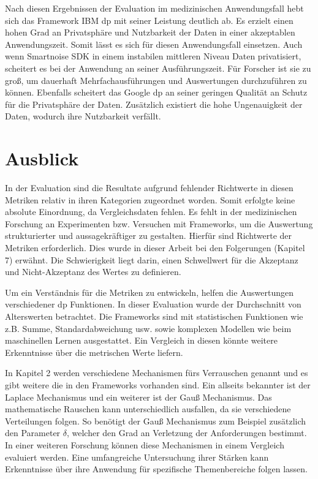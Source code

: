Nach diesen Ergebnissen der Evaluation im medizinischen Anwendungsfall hebt sich das Framework IBM \gls{dp} mit seiner Leistung deutlich ab. Es erzielt einen hohen Grad an Privatsphäre und Nutzbarkeit der Daten in einer akzeptablen Anwendungszeit. Somit lässt es sich für diesen Anwendungsfall einsetzen. Auch wenn Smartnoise SDK in einem instabilen mittleren Niveau Daten privatisiert, scheitert es bei der Anwendung an seiner Ausführungszeit. Für Forscher ist sie zu groß, um dauerhaft Mehrfachausführungen und Auswertungen durchzuführen zu können. Ebenfalls scheitert das Google \gls{dp} an seiner geringen Qualität an Schutz für die Privatsphäre der Daten. Zusätzlich existiert die hohe Ungenauigkeit der Daten, wodurch ihre Nutzbarkeit verfällt.
\section{Ausblick}
In der Evaluation sind die Resultate aufgrund fehlender Richtwerte in diesen Metriken relativ in ihren Kategorien zugeordnet worden. Somit erfolgte keine absolute Einordnung, da Vergleichsdaten fehlen. Es fehlt in der medizinischen Forschung an Experimenten bzw. Versuchen mit Frameworks, um die Auswertung strukturierter und aussagekräftiger zu gestalten. Hierfür sind Richtwerte der Metriken erforderlich. Dies wurde in dieser Arbeit bei den Folgerungen (Kapitel 7) erwähnt. Die Schwierigkeit liegt darin, einen Schwellwert für die Akzeptanz und Nicht-Akzeptanz des Wertes zu definieren. 

Um ein Verständnis für die Metriken zu entwickeln, helfen die Auswertungen verschiedener \gls{dp} Funktionen. In dieser Evaluation wurde der Durchschnitt von Alterswerten betrachtet. Die Frameworks sind mit statistischen Funktionen wie z.B. Summe, Standardabweichung usw. sowie komplexen Modellen wie beim maschinellen Lernen ausgestattet. Ein Vergleich in diesen könnte weitere Erkenntnisse über die metrischen Werte liefern.

In Kapitel 2 werden verschiedene Mechanismen fürs Verrauschen genannt und es gibt weitere die in den Frameworks vorhanden sind. Ein allseits bekannter ist der Laplace Mechanismus und ein weiterer ist der Gauß Mechanismus. Das mathematische Rauschen kann unterschiedlich ausfallen, da sie verschiedene Verteilungen folgen. So benötigt der Gauß Mechanismus zum Beispiel zusätzlich den Parameter $\delta$, welcher den Grad an Verletzung der Anforderungen bestimmt. In einer weiteren Forschung können diese Mechanismen in einem Vergleich evaluiert werden. Eine umfangreiche Untersuchung ihrer Stärken kann Erkenntnisse über ihre Anwendung für spezifische Themenbereiche folgen lassen.


